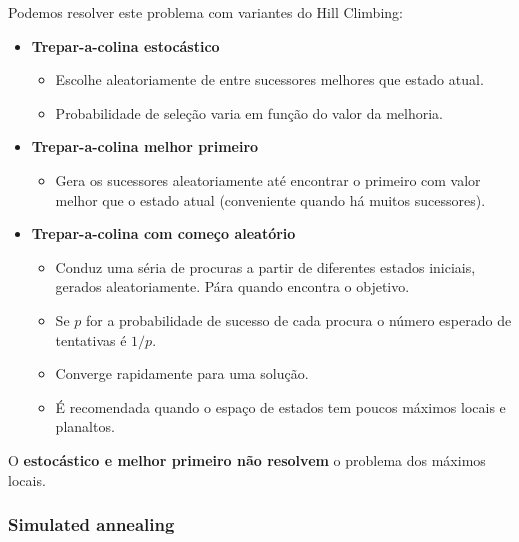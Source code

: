 \documentclass[11pt]{article}
\begin{document}
Podemos resolver este problema com variantes do Hill Climbing:
\begin{itemize}[topsep=2pt,itemsep=0pt]
    \item \textbf{Trepar-a-colina estocástico}
    \begin{itemize}[topsep=0pt,itemsep=0pt]
        \item Escolhe aleatoriamente de entre sucessores melhores que estado atual.
        \item Probabilidade de seleção varia em função do valor da melhoria.
    \end{itemize}
    \item \textbf{Trepar-a-colina melhor primeiro}
    \begin{itemize}[topsep=0pt,itemsep=0pt]
        \item Gera os sucessores aleatoriamente até encontrar o primeiro com
        valor melhor que o estado atual (conveniente quando há muitos sucessores).
    \end{itemize} 
    \item \textbf{Trepar-a-colina com começo aleatório}
    \begin{itemize}[topsep=0pt,itemsep=0pt]
        \item Conduz uma séria de procuras a partir de diferentes estados
        iniciais, gerados aleatoriamente. Pára quando encontra o objetivo.
        \item Se $p$ for a probabilidade de sucesso de cada procura o número esperado de tentativas é $1/p$.
        \item Converge rapidamente para uma solução.
        \item É recomendada quando o espaço de estados tem poucos máximos locais e planaltos.
    \end{itemize}
\end{itemize}
\vspace{4pt}

O \textbf{estocástico e melhor primeiro não resolvem} o problema dos máximos locais.

\subsubsection{Simulated annealing}
\end{document}
